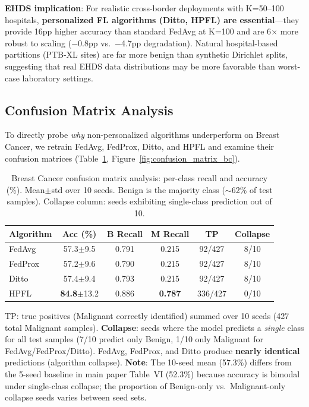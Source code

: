 \documentclass[conference,a4paper]{IEEEtran}
\begin{document}
\textbf{EHDS implication}: For realistic cross-border deployments with K=50--100 hospitals, \textbf{personalized FL algorithms (Ditto, HPFL) are essential}---they provide 16pp higher accuracy than standard FedAvg at K=100 and are 6$\times$ more robust to scaling ($-$0.8pp vs.\ $-$4.7pp degradation). Natural hospital-based partitions (PTB-XL sites) are far more benign than synthetic Dirichlet splits, suggesting that real EHDS data distributions may be more favorable than worst-case laboratory settings.

\subsection{Confusion Matrix Analysis}
\label{sec:confusion_matrix}

To directly probe \textit{why} non-personalized algorithms underperform on Breast Cancer, we retrain FedAvg, FedProx, Ditto, and HPFL and examine their confusion matrices (Table~\ref{tab:confusion_matrix_bc}, Figure~\ref{fig:confusion_matrix_bc}).

\begin{table}[htbp]
\centering
\caption{Breast Cancer confusion matrix analysis: per-class recall and accuracy (\%). Mean$\pm$std over 10 seeds. Benign is the majority class ($\sim$62\% of test samples). Collapse column: seeds exhibiting single-class prediction out of 10.}
\label{tab:confusion_matrix_bc}
\small
\begin{tabular}{lccccc}
\toprule
\textbf{Algorithm} & \textbf{Acc (\%)} & \textbf{B Recall} & \textbf{M Recall} & \textbf{TP} & \textbf{Collapse} \\
\midrule
FedAvg & 57.3{\tiny$\pm$9.5} & 0.791 & 0.215 & 92/427 & 8/10 \\
FedProx & 57.2{\tiny$\pm$9.6} & 0.790 & 0.215 & 92/427 & 8/10 \\
Ditto & 57.4{\tiny$\pm$9.4} & 0.793 & 0.215 & 92/427 & 8/10 \\
\midrule
HPFL & \textbf{84.8}{\tiny$\pm$13.2} & 0.886 & \textbf{0.787} & 336/427 & 0/10 \\
\bottomrule
\end{tabular}

\vspace{1mm}
\footnotesize{TP: true positives (Malignant correctly identified) summed over 10 seeds (427 total Malignant samples). \textbf{Collapse}: seeds where the model predicts a \textit{single} class for all test samples (7/10 predict only Benign, 1/10 only Malignant for FedAvg/FedProx/Ditto). FedAvg, FedProx, and Ditto produce \textbf{nearly identical} predictions (algorithm collapse). \textbf{Note}: The 10-seed mean (57.3\%) differs from the 5-seed baseline in main paper Table~VI (52.3\%) because accuracy is bimodal under single-class collapse; the proportion of Benign-only vs.\ Malignant-only collapse seeds varies between seed sets.}
\end{table}
\end{document}
